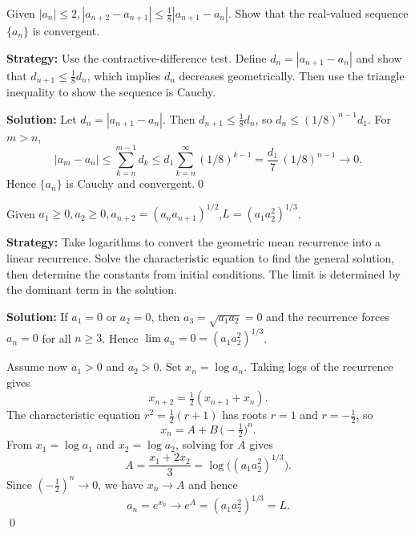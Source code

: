 \begin{problembox}
\begin{problemstatement}
Given \(|a_n| \leq 2, |a_{n+2} - a_{n+1}| \leq \frac{1}{8} |a_{n+1} - a_n|\). Show that the real-valued sequence \(\{a_n\}\) is convergent.
\end{problemstatement}
\end{problembox}

\noindent\textbf{Strategy:} Use the contractive-difference test. Define \(d_n=|a_{n+1}-a_n|\) and show that \(d_{n+1}\le \frac{1}{8}d_n\), which implies \(d_n\) decreases geometrically. Then use the triangle inequality to show the sequence is Cauchy.

\bigskip\noindent\textbf{Solution:}
Let \(d_n=|a_{n+1}-a_n|\). Then \(d_{n+1}\le \tfrac{1}{8}d_n\), so \(d_n\le (1/8)^{n-1} d_1\). For \(m>n\),
\[|a_m-a_n|\le \sum_{k=n}^{m-1} d_k \le d_1\sum_{k=n}^{\infty} (1/8)^{k-1}=\frac{d_1}{7}\,(1/8)^{n-1}\to 0.\]
Hence \(\{a_n\}\) is Cauchy and convergent.\qed


\begin{problembox}
\begin{problemstatement}
Given \(a_1 \geq 0, a_2 \geq 0, a_{n+2} = (a_n a_{n+1})^{1/2}\),\(L = (a_1 a_2^2)^{1/3}\).
\end{problemstatement}
\end{problembox}

\noindent\textbf{Strategy:} Take logarithms to convert the geometric mean recurrence into a linear recurrence. Solve the characteristic equation to find the general solution, then determine the constants from initial conditions. The limit is determined by the dominant term in the solution.

\bigskip\noindent\textbf{Solution:}
If \(a_1=0\) or \(a_2=0\), then \(a_3=\sqrt{a_1 a_2}=0\) and the recurrence forces \(a_n=0\) for all \(n\ge 3\). Hence \(\lim a_n=0=(a_1 a_2^2)^{1/3}\).

Assume now \(a_1>0\) and \(a_2>0\). Set \(x_n=\log a_n\). Taking logs of the recurrence gives
\[x_{n+2}=\tfrac{1}{2}(x_{n+1}+x_n).\]
The characteristic equation \(r^2=\tfrac{1}{2}(r+1)\) has roots \(r=1\) and \(r=-\tfrac{1}{2}\), so
\[x_n=A+B\,\big(-\tfrac{1}{2}\big)^{n}.\]
From \(x_1=\log a_1\) and \(x_2=\log a_2\), solving for \(A\) gives
\[A=\frac{x_1+2x_2}{3}=\log\big((a_1 a_2^2)^{1/3}\big).\]
Since \(({-}\tfrac{1}{2})^{n}\to 0\), we have \(x_n\to A\) and hence
\[a_n=e^{x_n}\longrightarrow e^{A}=(a_1 a_2^2)^{1/3}=L.\]\qed


